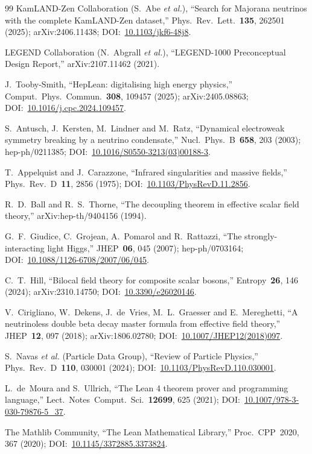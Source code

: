 \documentclass[aps,prd,twocolumn,showpacs,superscriptaddress,nofootinbib]{revtex4-2}
\begin{document}
\begin{thebibliography}{99}
KamLAND-Zen Collaboration (S.~Abe \emph{et al.}), ``Search for
Majorana neutrinos with the complete KamLAND-Zen dataset,''
Phys.~Rev.~Lett.~\textbf{135}, 262501 (2025); arXiv:2406.11438;
DOI:~\href{https://doi.org/10.1103/jkf6-48j8}{10.1103/jkf6-48j8}.

LEGEND Collaboration (N.~Abgrall \emph{et al.}), ``LEGEND-1000
Preconceptual Design Report,'' arXiv:2107.11462 (2021).

J.~Tooby-Smith, ``HepLean: digitalising high energy physics,''
Comput.~Phys.~Commun.~\textbf{308}, 109457 (2025); arXiv:2405.08863;
DOI:~\href{https://doi.org/10.1016/j.cpc.2024.109457}{10.1016/j.cpc.2024.109457}.

S.~Antusch, J.~Kersten, M.~Lindner and M.~Ratz, ``Dynamical
electroweak symmetry breaking by a neutrino condensate,''
Nucl.~Phys.~B~\textbf{658}, 203 (2003); hep-ph/0211385;
DOI:~\href{https://doi.org/10.1016/S0550-3213(03)00188-3}{10.1016/S0550-3213(03)00188-3}.

T.~Appelquist and J.~Carazzone, ``Infrared singularities and
massive fields,'' Phys.~Rev.~D~\textbf{11}, 2856 (1975);
DOI:~\href{https://doi.org/10.1103/PhysRevD.11.2856}{10.1103/PhysRevD.11.2856}.

R.~D.~Ball and R.~S.~Thorne, ``The decoupling theorem in effective
scalar field theory,'' arXiv:hep-th/9404156 (1994).

G.~F.~Giudice, C.~Grojean, A.~Pomarol and R.~Rattazzi, ``The
strongly-interacting light Higgs,'' JHEP~\textbf{06}, 045 (2007);
hep-ph/0703164;
DOI:~\href{https://doi.org/10.1088/1126-6708/2007/06/045}{10.1088/1126-6708/2007/06/045}.

C.~T.~Hill, ``Bilocal field theory for composite scalar bosons,''
Entropy~\textbf{26}, 146 (2024); arXiv:2310.14750;
DOI:~\href{https://doi.org/10.3390/e26020146}{10.3390/e26020146}.

V.~Cirigliano, W.~Dekens, J.~de~Vries, M.~L.~Graesser and
E.~Mereghetti, ``A neutrinoless double beta decay master formula
from effective field theory,'' JHEP~\textbf{12}, 097 (2018);
arXiv:1806.02780;
DOI:~\href{https://doi.org/10.1007/JHEP12(2018)097}{10.1007/JHEP12(2018)097}.

S.~Navas \emph{et al.} (Particle Data Group), ``Review of Particle
Physics,'' Phys.~Rev.~D~\textbf{110}, 030001 (2024);
DOI:~\href{https://doi.org/10.1103/PhysRevD.110.030001}{10.1103/PhysRevD.110.030001}.

L.~de~Moura and S.~Ullrich, ``The Lean 4 theorem prover and
programming language,'' Lect.~Notes~Comput.~Sci.~\textbf{12699}, 625
(2021); DOI:~\href{https://doi.org/10.1007/978-3-030-79876-5_37}{10.1007/978-3-030-79876-5\_37}.

The Mathlib Community, ``The Lean Mathematical Library,''
Proc.~CPP~2020, 367 (2020);
DOI:~\href{https://doi.org/10.1145/3372885.3373824}{10.1145/3372885.3373824}.

\end{thebibliography}
\end{document}
